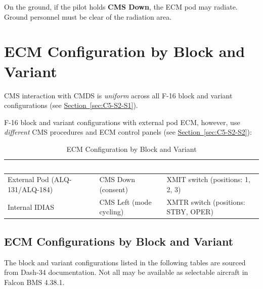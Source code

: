 \documentclass[11pt, a4paper, twoside]{report}
\newcommand{\secref}[1]{\hyperref[#1]{Section~\ref*{#1}}}
\begin{document}
On the ground, if the pilot holds \textbf{CMS Down}, the ECM pod may radiate. Ground personnel must be clear of the radiation area.

\section{ECM Configuration by Block and Variant}
\label{sec:C5-S3}

CMS interaction with CMDS is \textit{uniform} across all F-16 block and variant configurations (see \secref{sec:C5-S2-S1}).

F-16 block and variant configurations with external pod ECM, however, use \textit{different} CMS procedures and ECM control panels (see \secref{sec:C5-S2-S2}):

\begin{table}[H]
\centering
\caption{ECM Configuration by Block and Variant}
\label{tab:C5-S3-ecm-config-summary}
\small
\renewcommand{\arraystretch}{1.25}
\begin{tabular}{|>{\raggedright\arraybackslash}p{3.6cm}|>{\raggedright\arraybackslash}p{3.6cm}|>{\raggedright\arraybackslash}p{4.6cm}|}
\hline
\rowcolor{headerblue}
\textcolor{white}{\textbf{ECM Configuration}} & \textcolor{white}{\textbf{CMS Direction}} & \textcolor{white}{\textbf{Panel Control}} \\
\hline
External Pod (ALQ-131/ALQ-184) & CMS Down (consent) & XMIT switch (positions: 1, 2, 3) \\
\hline
Internal IDIAS & CMS Left (mode cycling) & XMTR switch (positions: STBY, OPER) \\
\hline
\end{tabular}
\end{table}

\subsection{ECM Configurations by Block and Variant}
\label{sec:C5-S3-S1}

The block and variant configurations listed in the following tables are sourced from Dash-34 documentation. Not all may be available as selectable aircraft in Falcon BMS 4.38.1.
\end{document}
